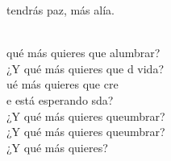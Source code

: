 \begin{cancion}
	tendrás paz, más alía.\\\jump\\
	\begin{chorus}%
	 qué más quieres que alumbrar?\\
	¿Y qué más quieres que d vida?\\
	ué más quieres que cre \\
	e está esperando sda?\\
	¿Y qué más quieres queumbrar?\\
	¿Y qué más quieres queumbrar?\\
¿Y qué más quieres?\\
	\end{chorus}%
	\jump\\
\end{cancion}%
